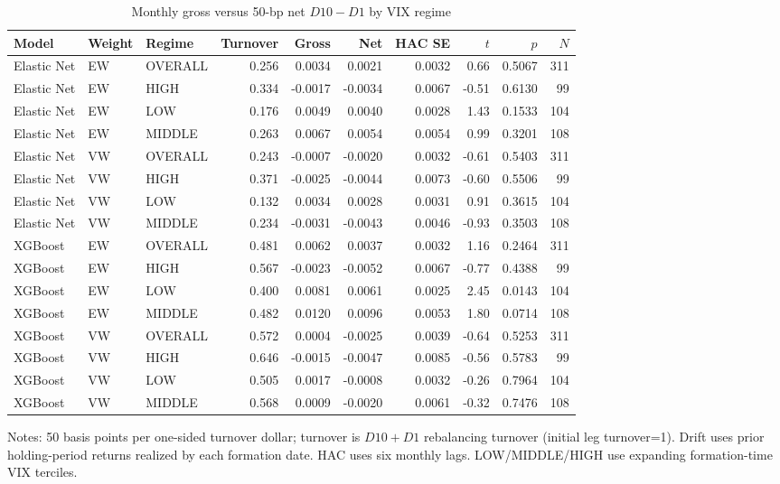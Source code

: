 \begin{table}[htbp]
\centering
\caption{Monthly gross versus 50-bp net $D10-D1$ by VIX regime}
\label{tab:transaction-costs}
\small
\begin{tabular}{lllrrrrrrr}
\hline
Model & Weight & Regime & Turnover & Gross & Net & HAC SE & $t$ & $p$ & $N$ \\
\hline
Elastic Net & EW & OVERALL & 0.256 & 0.0034 & 0.0021 & 0.0032 & 0.66 & 0.5067 & 311 \\
Elastic Net & EW & HIGH & 0.334 & -0.0017 & -0.0034 & 0.0067 & -0.51 & 0.6130 & 99 \\
Elastic Net & EW & LOW & 0.176 & 0.0049 & 0.0040 & 0.0028 & 1.43 & 0.1533 & 104 \\
Elastic Net & EW & MIDDLE & 0.263 & 0.0067 & 0.0054 & 0.0054 & 0.99 & 0.3201 & 108 \\
Elastic Net & VW & OVERALL & 0.243 & -0.0007 & -0.0020 & 0.0032 & -0.61 & 0.5403 & 311 \\
Elastic Net & VW & HIGH & 0.371 & -0.0025 & -0.0044 & 0.0073 & -0.60 & 0.5506 & 99 \\
Elastic Net & VW & LOW & 0.132 & 0.0034 & 0.0028 & 0.0031 & 0.91 & 0.3615 & 104 \\
Elastic Net & VW & MIDDLE & 0.234 & -0.0031 & -0.0043 & 0.0046 & -0.93 & 0.3503 & 108 \\
XGBoost & EW & OVERALL & 0.481 & 0.0062 & 0.0037 & 0.0032 & 1.16 & 0.2464 & 311 \\
XGBoost & EW & HIGH & 0.567 & -0.0023 & -0.0052 & 0.0067 & -0.77 & 0.4388 & 99 \\
XGBoost & EW & LOW & 0.400 & 0.0081 & 0.0061 & 0.0025 & 2.45 & 0.0143 & 104 \\
XGBoost & EW & MIDDLE & 0.482 & 0.0120 & 0.0096 & 0.0053 & 1.80 & 0.0714 & 108 \\
XGBoost & VW & OVERALL & 0.572 & 0.0004 & -0.0025 & 0.0039 & -0.64 & 0.5253 & 311 \\
XGBoost & VW & HIGH & 0.646 & -0.0015 & -0.0047 & 0.0085 & -0.56 & 0.5783 & 99 \\
XGBoost & VW & LOW & 0.505 & 0.0017 & -0.0008 & 0.0032 & -0.26 & 0.7964 & 104 \\
XGBoost & VW & MIDDLE & 0.568 & 0.0009 & -0.0020 & 0.0061 & -0.32 & 0.7476 & 108 \\
\hline
\end{tabular}
\begin{flushleft}
\small Notes: 50 basis points per one-sided turnover dollar; turnover is $D10+D1$ rebalancing turnover (initial leg turnover=1). Drift uses prior holding-period returns realized by each formation date. HAC uses six monthly lags. LOW/MIDDLE/HIGH use expanding formation-time VIX terciles.
\end{flushleft}
\end{table}
